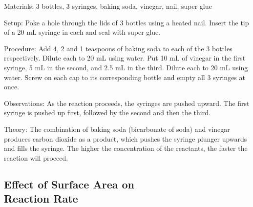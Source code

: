 \begin{multicols}{2}

\begin{description*}
\item[Materials:]{3 bottles, 3 syringes, baking soda, vinegar, nail, super glue}
\item[Setup:]{Poke a hole through the lids of 3 bottles using a heated nail. Insert the tip of a 20 mL syringe in each and seal with super glue.}
\item[Procedure:]{Add 4, 2 and 1 teaspoons of baking soda to each of the 3 bottles respectively. Dilute each to 20 mL using water. Put 10 mL of vinegar in the first syringe, 5 mL in the second, and 2.5 mL in the third. Dilute each to 20 mL using water. Screw on each cap to its corresponding bottle and empty all 3 syringes at once.}
\item[Observations:]{As the reaction proceeds, the syringes are pushed upward. The first syringe is pushed up first, followed by the second and then the third.}
\item[Theory:]{The combination of baking soda (bicarbonate of soda) and vinegar produces carbon dioxide as a product, which pushes the syringe plunger upwards and fills the syringe. The higher the concentration of the reactants, the faster the reaction will proceed.}
\end{description*}

\columnbreak

\subsection{Effect of Surface Area on \hfill \\ Reaction Rate}



\end{multicols}
